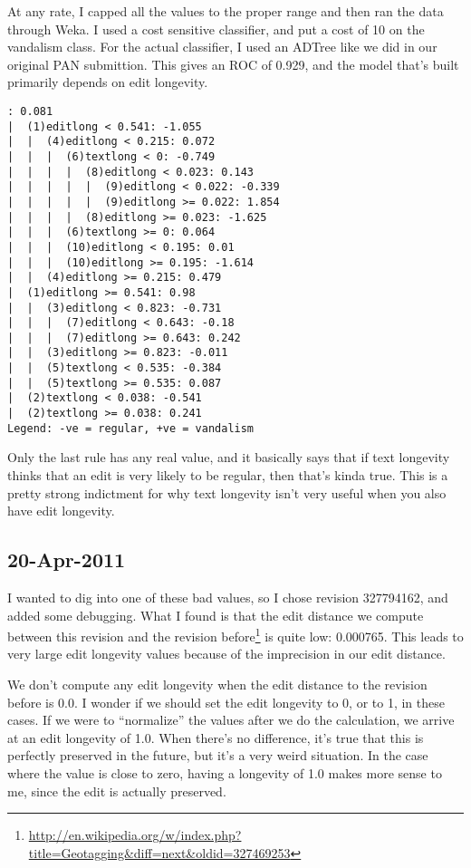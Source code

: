 At any rate, I capped all the values to the proper range and
then ran the data through Weka.
I used a cost sensitive classifier, and put a cost of 10 on the vandalism
class.
For the actual classifier, I used an ADTree like we did in our
original PAN submittion.
This gives an ROC of 0.929,
and the model that's built primarily depends on edit longevity.
\begin{verbatim}
: 0.081
|  (1)editlong < 0.541: -1.055
|  |  (4)editlong < 0.215: 0.072
|  |  |  (6)textlong < 0: -0.749
|  |  |  |  (8)editlong < 0.023: 0.143
|  |  |  |  |  (9)editlong < 0.022: -0.339
|  |  |  |  |  (9)editlong >= 0.022: 1.854
|  |  |  |  (8)editlong >= 0.023: -1.625
|  |  |  (6)textlong >= 0: 0.064
|  |  |  (10)editlong < 0.195: 0.01
|  |  |  (10)editlong >= 0.195: -1.614
|  |  (4)editlong >= 0.215: 0.479
|  (1)editlong >= 0.541: 0.98
|  |  (3)editlong < 0.823: -0.731
|  |  |  (7)editlong < 0.643: -0.18
|  |  |  (7)editlong >= 0.643: 0.242
|  |  (3)editlong >= 0.823: -0.011
|  |  (5)textlong < 0.535: -0.384
|  |  (5)textlong >= 0.535: 0.087
|  (2)textlong < 0.038: -0.541
|  (2)textlong >= 0.038: 0.241
Legend: -ve = regular, +ve = vandalism
\end{verbatim}
Only the last rule has any real value, and it basically
says that if text longevity thinks that an edit is
very likely to be regular, then that's kinda true.
This is a pretty strong indictment for why text longevity
isn't very useful when you also have edit longevity.

\subsection{20-Apr-2011}

I wanted to dig into one of these bad values, so I chose
revision 327794162, and added some debugging.
What I found is that the edit distance we compute between
this revision and the revision
before\footnote{\url{http://en.wikipedia.org/w/index.php?title=Geotagging&diff=next&oldid=327469253}}
is quite low: 0.000765.
This leads to very large edit longevity values because of the
imprecision in our edit distance.

We don't compute any edit longevity when the edit distance to
the revision before is 0.0.  I wonder if we should set the edit
longevity to 0, or to 1, in these cases.
If we were to ``normalize'' the values after we do the calculation,
we arrive at an edit longevity of 1.0.
When there's no difference, it's true that this is perfectly
preserved in the future, but it's a very weird situation.
In the case where the value is close to zero, having
a longevity of 1.0 makes more sense to me, since the edit
is actually preserved.


